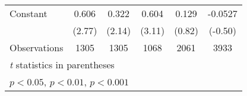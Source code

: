 {\begin{tabular}{l*{5}{c}}
\addlinespace
Constant        &    0.606\sym{**} &    0.322\sym{*}  &    0.604\sym{**} &    0.129         &  -0.0527         \\
                &   (2.77)         &   (2.14)         &   (3.11)         &   (0.82)         &  (-0.50)         \\
\midrule
Observations    &     1305         &     1305         &     1068         &     2061         &     3933         \\
\bottomrule
\multicolumn{6}{l}{\footnotesize \textit{t} statistics in parentheses}\\
\multicolumn{6}{l}{\footnotesize \sym{*} \(p<0.05\), \sym{**} \(p<0.01\), \sym{***} \(p<0.001\)}\\
\end{tabular}
}
